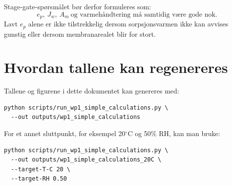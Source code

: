 \documentclass[11pt,a4paper]{article}
\begin{document}
Stage-gate-spørsmålet bør derfor formuleres som:
\begin{equation*}
    \boxed{e_p,\ J_w,\ A_m\ \text{og varmehåndtering må samtidig være gode nok.}}
\end{equation*}
Lavt $e_p$ alene er ikke tilstrekkelig dersom sorpsjonsvarmen ikke kan avvises gunstig eller dersom membranarealet blir for stort.

\section{Hvordan tallene kan regenereres}

Tallene og figurene i dette dokumentet kan genereres med:
\begin{verbatim}
python scripts/run_wp1_simple_calculations.py \
  --out outputs/wp1_simple_calculations
\end{verbatim}

For et annet sluttpunkt, for eksempel 20$^\circ$C og 50\% RH, kan man bruke:
\begin{verbatim}
python scripts/run_wp1_simple_calculations.py \
  --out outputs/wp1_simple_calculations_20C \
  --target-T-C 20 \
  --target-RH 0.50
\end{verbatim}
\end{document}
